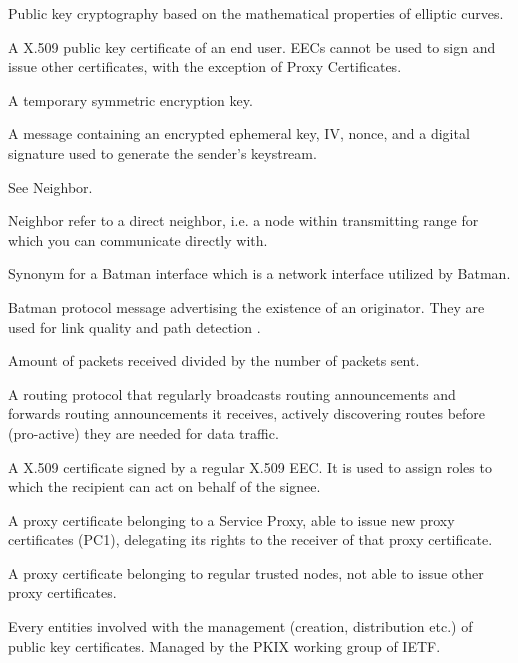 \begin{acronym}
	Public key cryptography based on the mathematical properties of elliptic
	curves.

	A X.509 public key certificate of an end user. EECs cannot be used to sign and
	issue other certificates, with the exception of Proxy Certificates.
	
	A temporary symmetric encryption key. 

	A message containing an encrypted ephemeral key, IV, nonce, and a digital
	signature used to generate the sender's keystream.

	See Neighbor.

	Neighbor refer to a direct neighbor, i.e. a node within
	transmitting range for which you can communicate directly with.

	Synonym for a Batman interface which is a network interface utilized by
	Batman.

	Batman protocol message advertising the existence of an originator. They are
	used for link quality and path detection \cite{batman_rfc}.

	Amount of packets received divided by the number of packets sent.

	A routing protocol that regularly broadcasts routing announcements and
	forwards routing announcements it receives, actively discovering routes before
	(pro-active) they are needed for data traffic.

	A X.509 certificate signed by a regular X.509 EEC. It is used to assign roles
	to which the recipient can act on behalf of the signee.

	A proxy certificate belonging to a Service Proxy, able to issue new proxy
	certificates (PC1), delegating its rights to the receiver of that proxy
	certificate.
	
	A proxy certificate belonging to regular trusted nodes, not able to issue other
	proxy certificates.
	
	
	Every entities involved with the management (creation, distribution etc.) of
	public key certificates. Managed by the PKIX working group of IETF.



\end{acronym}
